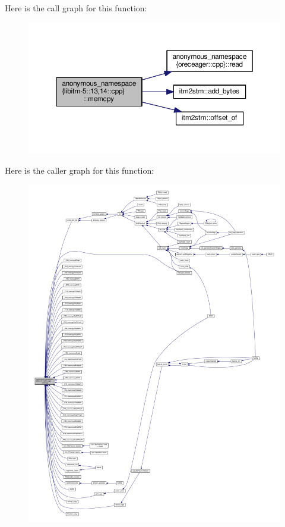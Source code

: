 Here is the call graph for this function\-:
\nopagebreak
\begin{figure}[H]
\begin{center}
\leavevmode
\includegraphics[width=350pt]{namespaceanonymous__namespace_02libitm-5_813_0014_8cpp_03_a8b7be7cf3afef27c0623b844ce9116d8_cgraph}
\end{center}
\end{figure}




Here is the caller graph for this function\-:
\nopagebreak
\begin{figure}[H]
\begin{center}
\leavevmode
\includegraphics[width=350pt]{namespaceanonymous__namespace_02libitm-5_813_0014_8cpp_03_a8b7be7cf3afef27c0623b844ce9116d8_icgraph}
\end{center}
\end{figure}


